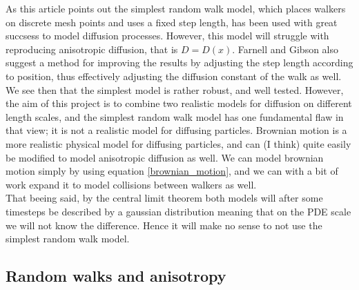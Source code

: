 As this article points out \cite{farnell2005monte} the simplest random walk model, which places walkers on discrete mesh points and uses a fixed step length, has been used with great succsess to model diffusion processes. 
However, this model will struggle with reproducing anisotropic diffusion, that is $D = D(x)$. Farnell and Gibson also suggest a method for improving the results by adjusting the step length according to position, thus effectively adjusting the diffusion constant of the walk as well. 
We see then that the simplest model is rather robust, and well tested. 
However, the aim of this project is to combine two realistic models for diffusion on different length scales, and the simplest random walk model has one fundamental flaw in that view; it is not a realistic model for diffusing particles. 
Brownian motion is a more realistic physical model for diffusing particles, and can (I think) quite easily be modified to model anisotropic diffusion as well. 
We can model brownian motion simply by using equation \ref{brownian_motion}, and we can with a bit of work expand it to model collisions between walkers as well. \\
That beeing said, by the central limit theorem both models will after some timesteps be described by a gaussian distribution meaning that on the PDE scale we will not know the difference. 
Hence it will make no sense to not use the simplest random walk model.


\subsection{Random walks and anisotropy}\label{random_walks_and_anisotropy}

